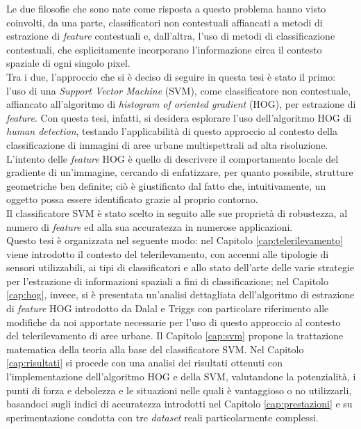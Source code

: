 Le due filosofie che sono nate come risposta a questo problema hanno visto coinvolti, da una parte, classificatori non contestuali affiancati a metodi di estrazione di \emph{feature} contestuali e, dall'altra, l'uso di metodi di classificazione contestuali, che esplicitamente incorporano l'informazione circa il contesto spaziale di ogni singolo pixel.\\
Tra i due, l'approccio che si è deciso di seguire in questa tesi è stato il primo: l'uso di una \emph{Support Vector Machine} (SVM), come classificatore non contestuale, affiancato all'algoritmo di \emph{histogram of oriented gradient} (HOG), per estrazione di \emph{feature}.
Con questa tesi, infatti, si desidera esplorare l'uso dell'algoritmo HOG di \emph{human detection}, testando l'applicabilità di questo approccio al contesto della classificazione di immagini di aree urbane multispettrali ad alta risoluzione. L'intento delle \emph{feature} HOG è quello di descrivere il comportamento locale del gradiente di un'immagine, cercando di enfatizzare, per quanto possibile, strutture geometriche ben definite; ciò è giustificato dal fatto che, intuitivamente, un oggetto possa essere identificato grazie al proprio contorno.\\
Il classificatore SVM è stato scelto in seguito alle sue proprietà di robustezza, al numero di \emph{feature} ed alla sua accuratezza in numerose applicazioni.\\

Questo tesi è organizzata nel seguente modo: nel Capitolo \ref{cap:telerilevamento} viene introdotto il contesto del telerilevamento, con accenni alle tipologie di sensori utilizzabili, ai tipi di classificatori e allo stato dell'arte delle varie strategie per l'estrazione di informazioni spaziali a fini di classificazione; nel Capitolo \ref{cap:hog}, invece, si è presentata un'analisi dettagliata dell'algoritmo di estrazione di \emph{feature} HOG introdotto da Dalal e Triggs \citep{Art_HOGHuman} con particolare riferimento alle modifiche da noi apportate necessarie per l'uso di questo approccio al contesto del telerilevamento di aree urbane. Il Capitolo \ref{cap:svm} propone la trattazione matematica della teoria alla base del classificatore SVM.
Nel Capitolo \ref{cap:risultati} si procede con una analisi dei risultati ottenuti con l'implementazione dell'algoritmo HOG e della SVM, valutandone la potenzialità, i punti di forza e debolezza e le situazioni nelle quali è vantaggioso o no utilizzarli, basandoci sugli indici di accuratezza introdotti nel Capitolo \ref{cap:prestazioni} e su sperimentazione condotta con tre \emph{dataset} reali particolarmente complessi.





